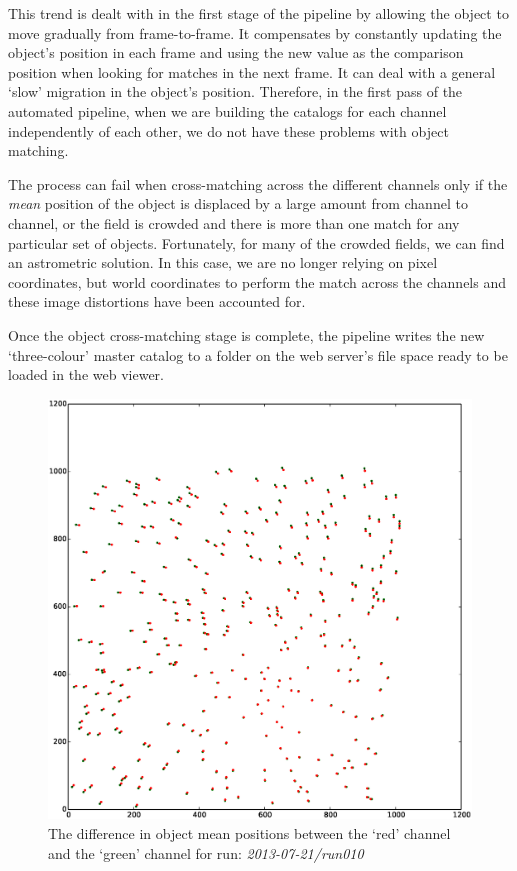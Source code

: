 This trend is dealt with in the first stage of the pipeline by allowing the object to move gradually from frame-to-frame. It compensates by constantly updating the object's position in each frame and using the new value as the comparison position when looking for matches in the next frame. It can deal with a general `slow' migration in the object's position. Therefore, in the first pass of the automated pipeline, when we are building the catalogs for each channel independently of each other, we do not have these problems with object matching. 

The process can fail when cross-matching across the different channels only if the \emph{mean} position of the object is displaced by a large amount from channel to channel, or the field is crowded and there is more than one match for any particular set of objects. Fortunately, for many of the crowded fields, we can find an astrometric solution. In this case, we are no longer relying on pixel coordinates, but world coordinates to perform the match across the channels and these image distortions have been accounted for. 

Once the object cross-matching stage is complete, the pipeline writes the new `three-colour' master catalog to a folder on the web server's file space ready to be loaded in the web viewer. 

\begin{figure}
  \centering
  \includegraphics[width=\textwidth]{images/objectOffset_run010_g.eps}
  \caption{The difference in object mean positions between the `red' channel and the `green' channel for run: \emph{2013-07-21/run010} }
\label{fig:greenblueoffset}
\end{figure}


